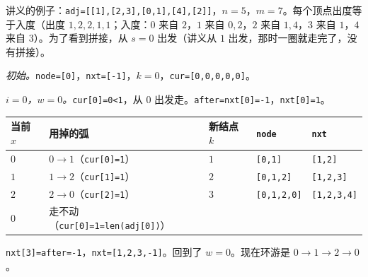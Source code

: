 \begin{example}\label{ex:euler-tours:linked}
讲义的例子：\texttt{adj=[[1],[2,3],[0,1],[4],[2]]}，$n=5$，$m=7$。每个顶点出度等于入度（出度 $1,2,2,1,1$；入度：$0$ 来自 $2$，$1$ 来自 $0,2$，$2$ 来自 $1,4$，$3$ 来自 $1$，$4$ 来自 $3$）。为了看到拼接，从 $s=0$ 出发（讲义从 $1$ 出发，那时一圈就走完了，没有拼接）。
\begin{center}
\end{center}

\emph{初始。}\texttt{node=[0]}，\texttt{nxt=[-1]}，$k=0$，\texttt{cur=[0,0,0,0,0]}。

\emph{$i=0$，$w=0$。}\texttt{cur[0]=0<1}，从 $0$ 出发走。\texttt{after=nxt[0]=-1}，\texttt{nxt[0]=1}。
\begin{center}
\small
\begin{tabular}{lllll}
\toprule
当前 $x$ & 用掉的弧 & 新结点 $k$ & \texttt{node} & \texttt{nxt} \\
\midrule
$0$ & $0\to1$（\texttt{cur[0]=1}） & $1$ & \texttt{[0,1]} & \texttt{[1,2]} \\
$1$ & $1\to2$（\texttt{cur[1]=1}） & $2$ & \texttt{[0,1,2]} & \texttt{[1,2,3]} \\
$2$ & $2\to0$（\texttt{cur[2]=1}） & $3$ & \texttt{[0,1,2,0]} & \texttt{[1,2,3,4]} \\
$0$ & 走不动（\texttt{cur[0]=1=len(adj[0])}） & & & \\
\bottomrule
\end{tabular}
\end{center}
\texttt{nxt[3]=after=-1}，\texttt{nxt=[1,2,3,-1]}。回到了 $w=0$。现在环游是 $0\to1\to2\to0$。


\end{example}
